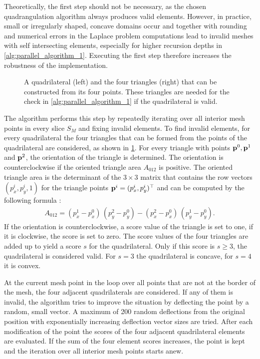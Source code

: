 Theoretically, the first step should not be necessary, as the chosen quadrangulation algorithm always produces valid elements. However, in practice, small or irregularly shaped, concave domains occur and together with rounding and numerical errors in the Laplace problem computations lead to invalid meshes with self intersecting elements, especially for higher recursion depths in \cref{alg:parallel_algorithm_1}. Executing the first step therefore increases the robustness of the implementation.

\begin{figure}%
  \centering%
  \def\svgwidth{0.7\textwidth}%
  \caption{A quadrilateral (left) and the four triangles (right) that can be constructed from its four points. These triangles are needed for the check in \cref{alg:parallel_algorithm_1} if the quadrilateral is valid.}%
  \label{fig:quads_tris}%
\end{figure}%

The algorithm performs this step by repeatedly iterating over all interior mesh points in every slice $S_M$ and fixing invalid elements. To find invalid elements, for every quadrilateral the four triangles that can be formed from the points of the quadrilateral are considered, as shown in \cref{fig:quads_tris}.
For every triangle with points $\textbf{p}^0,\textbf{p}^1$ and $\textbf{p}^2$, the orientation of the triangle is determined. The orientation is counterclockwise if the oriented triangle area $A_{012}$ is positive. The oriented triangle area is the determinant of the $3 \times 3$ matrix that contains the row vectors $(p^i_x,p^i_y,1)$ for the triangle points $\textbf{p}^i=(p^i_x,p^i_y)^\top$ and can be computed by the following formula \cite{sedgewick2011algorithms}:
%
\begin{align*}
  A_{012} = (p^1_x-p^0_x)\,(p^2_y-p^0_y) - (p^2_x-p^0_x)\,(p^1_y-p^0_y).
\end{align*}
If the orientation is counterclockwise, a score value of the triangle is set to one, if it is clockwise, the score is set to zero. The score values of the four triangles are added up to yield a score $s$ for the quadrilateral. Only if this score is $s \geq 3$, the quadrilateral is considered valid. For $s = 3$ the quadrilateral is concave, for $s=4$ it is convex.

At the current mesh point in the loop over all points that are not at the border of the mesh, the four adjacent quadrilaterals are considered. If any of them is invalid, the algorithm tries to improve the situation by deflecting the point by a random, small vector. A maximum of 200 random deflections from the original position with exponentially increasing deflection vector sizes are tried. After each modification of the point the scores of the four adjacent quadrilateral elements are evaluated. If the sum of the four element scores increases, the point is kept and the iteration over all interior mesh points starts anew. 

